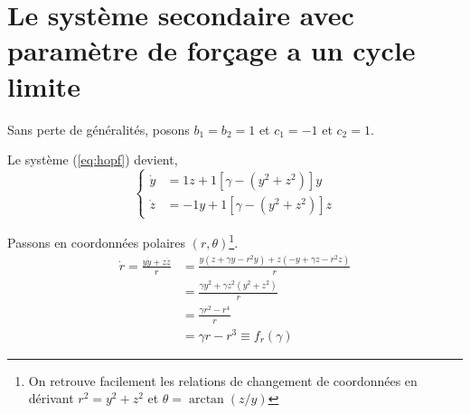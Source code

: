 



\section{Le système secondaire avec paramètre de forçage a un cycle limite}

Sans perte de généralités, posons $b_1 = b_2 = 1$ et $c_1 = -1$ et $c_2 = 1$.

Le système (\ref{eq:hopf}) devient,
\begin{equation}
  \begin{cases}
    \dot{y} &= 1z + 1[\gamma - (y^2 + z^2)]y \\
    \dot{z} &= -1y + 1[\gamma - (y^2 + z^2)]z
  \end{cases}
\end{equation}

Passons en coordonnées polaires $(r, \theta)$\footnote{On retrouve facilement les relations de changement de coordonnées en dérivant $r^2 = y^2 + z^2$ et $\theta = \arctan(z/y)$}.
\begin{align*}
  \dot{r} = \frac{y\dot{y} + z\dot{z}}{r}
    &= \frac{y(z + \gamma y - r^2 y) + z(-y + \gamma z - r^2 z)}{r} \\
    &= \frac{\gamma y^2 + \gamma z^2(y^2 + z^2)}{r} \\
    &= \frac{\gamma r^2 - r^4}{r} \\
    &= \gamma r - r^3 \equiv f_r(\gamma)
\end{align*}

